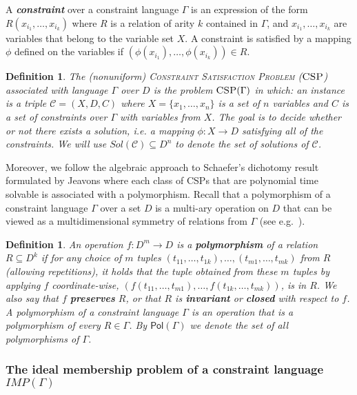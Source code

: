 \documentclass[11pt]{article}
\newcommand{\Cc}{\mathcal{C}}
\newcommand{\CSP}{\textsc{CSP}}
\newcommand{\Pol}{\textsf{Pol}}
\newcommand{\1}{\textbf{1}}
\newtheorem{definition}[theorem]{Definition}
\begin{document}
A \emph{\textbf{constraint}} over a constraint language $\Gamma$ is an expression of the form $R(x_{i_1},\ldots, x_{i_k})$ where $R$ is a relation of arity $k$ contained in $\Gamma$, and $x_{i_1},\ldots, x_{i_k}$ are variables that belong to the variable set $X$. A constraint is satisfied by a mapping $\phi$ defined on the variables if $(\phi(x_{i_1}),\ldots, \phi(x_{i_k}))\in R$.

\begin{definition}\label{def:csp}
 The \emph{(nonuniform) \textsc{Constraint Satisfaction Problem} ($\CSP$)} associated with language $\Gamma$ over $D$ is the problem $\CSP(\Gamma)$ in which: an instance is a triple $\Cc=(X,D,C)$ where $X=\{x_1,\ldots,x_n\}$ is a set of $n$ variables and $C$  is a set of constraints over $\Gamma$ with variables from $X$. The goal is to decide whether or not there exists a solution, i.e. a mapping $\phi: X\rightarrow D$ satisfying all of the constraints. We will use $Sol(\Cc)\subseteq D^n$ to denote the set of solutions of $\Cc$.
\end{definition}
Moreover, we follow the algebraic approach to Schaefer's dichotomy result \cite{Schaefer78} formulated by Jeavons \cite{JEAVONS1998185} where each class of CSPs that are polynomial time solvable is associated with a polymorphism.
Recall that a polymorphism of a constraint language $\Gamma$ over a set $D$ is a multi-ary operation on $D$ that can be viewed as a multidimensional symmetry of relations from $\Gamma$ (see e.g.~\cite{barto_et_al:DFU:2017:6959}).
\begin{definition}\label{def:polymorph}
An operation $f:D^m \rightarrow D$ is a \textbf{polymorphism} of a relation $R\subseteq D^k$ if for any choice of $m$ tuples $(t_{11},\dots,t_{1k}),\dots,(t_{m1},\dots,t_{mk})$ from $R$ (allowing repetitions), it holds that the tuple obtained from these $m$ tuples by applying $f$ coordinate-wise, $(f(t_{11},\dots,t_{m1}),\dots,f(t_{1k},\dots,t_{mk}))$, is in $R$. We also say that $f$ \textbf{preserves} $R$, or that $R$ is \textbf{invariant} or \textbf{closed} with respect to $f$. A polymorphism of a constraint language $\Gamma$ is an operation that is a polymorphism of every $R\in \Gamma$. By $\Pol(\Gamma)$ we denote the set of all polymorphisms of $\Gamma$. 
\end{definition}




\subsubsection[The ideal membership problem of a constraint language IMP(Gamma)]{The ideal membership problem of a constraint language $IMP(\Gamma)$}\label{sec:IMPdef}
\end{document}
